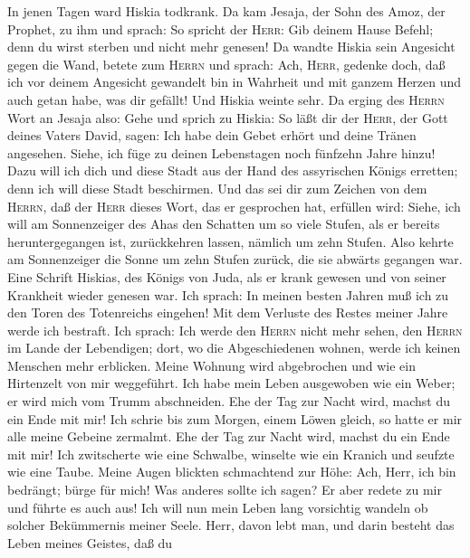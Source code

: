  In jenen Tagen ward Hiskia todkrank. Da kam Jesaja, der
Sohn des Amoz, der Prophet, zu ihm und sprach: So spricht der
\textsc{Herr}: Gib deinem Hause Befehl; denn du wirst sterben und nicht
mehr genesen!  Da wandte Hiskia sein Angesicht gegen die
Wand, betete zum \textsc{Herrn} und sprach:  Ach,
\textsc{Herr}, gedenke doch, daß ich vor deinem Angesicht gewandelt bin
in Wahrheit und mit ganzem Herzen und auch getan habe, was dir gefällt!
Und Hiskia weinte sehr.  Da erging des \textsc{Herrn} Wort
an Jesaja also:  Gehe und sprich zu Hiskia: So läßt dir
der \textsc{Herr}, der Gott deines Vaters David, sagen: Ich habe dein
Gebet erhört und deine Tränen angesehen. Siehe, ich füge zu deinen
Lebenstagen noch fünfzehn Jahre hinzu!  Dazu will ich dich
und diese Stadt aus der Hand des assyrischen Königs erretten; denn ich
will diese Stadt beschirmen.  Und das sei dir zum Zeichen
von dem \textsc{Herrn}, daß der \textsc{Herr} dieses Wort, das er
gesprochen hat, erfüllen wird:  Siehe, ich will am
Sonnenzeiger des Ahas den Schatten um so viele Stufen, als er bereits
heruntergegangen ist, zurückkehren lassen, nämlich um zehn Stufen. Also
kehrte am Sonnenzeiger die Sonne um zehn Stufen zurück, die sie abwärts
gegangen war.  Eine Schrift Hiskias, des Königs von Juda,
als er krank gewesen und von seiner Krankheit wieder genesen war.
 Ich sprach: In meinen besten Jahren muß ich zu den Toren
des Totenreichs eingehen! Mit dem Verluste des Restes meiner Jahre werde
ich bestraft.  Ich sprach: Ich werde den \textsc{Herrn}
nicht mehr sehen, den \textsc{Herrn} im Lande der Lebendigen; dort, wo
die Abgeschiedenen wohnen, werde ich keinen Menschen mehr erblicken.
 Meine Wohnung wird abgebrochen und wie ein Hirtenzelt
von mir weggeführt. Ich habe mein Leben ausgewoben wie ein Weber; er
wird mich vom Trumm abschneiden. Ehe der Tag zur Nacht wird, machst du
ein Ende mit mir!  Ich schrie bis zum Morgen, einem Löwen
gleich, so hatte er mir alle meine Gebeine zermalmt. Ehe der Tag zur
Nacht wird, machst du ein Ende mit mir!  Ich zwitscherte
wie eine Schwalbe, winselte wie ein Kranich und seufzte wie eine Taube.
Meine Augen blickten schmachtend zur Höhe: Ach, Herr, ich bin bedrängt;
bürge für mich!  Was anderes sollte ich sagen? Er aber
redete zu mir und führte es auch aus! Ich will nun mein Leben lang
vorsichtig wandeln ob solcher Bekümmernis meiner Seele. 
Herr, davon lebt man, und darin besteht das Leben meines Geistes, daß du
